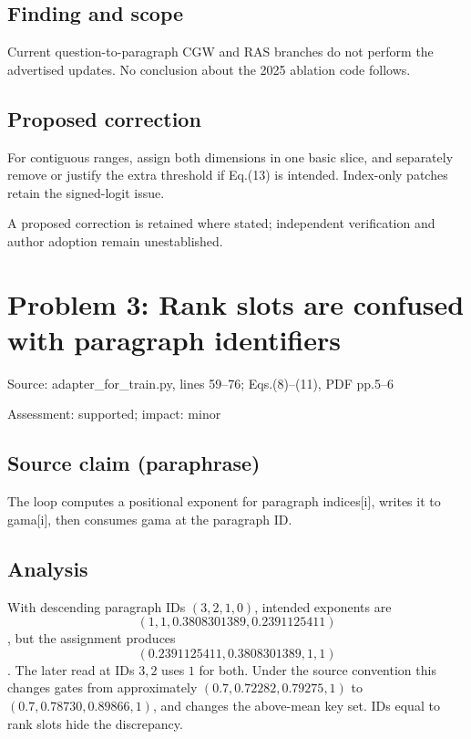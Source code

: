 \documentclass[11pt]{article}
\begin{document}
\subsection*{Finding and scope}

Current question-to-paragraph CGW and RAS branches do not perform the advertised updates. No conclusion about the 2025 ablation code follows.

\subsection*{Proposed correction}

For contiguous ranges, assign both dimensions in one basic slice, and separately remove or justify the extra threshold if Eq.(13) is intended. Index-only patches retain the signed-logit issue.

A proposed correction is retained where stated; independent verification and author adoption remain unestablished.

\section*{Problem 3: Rank slots are confused with paragraph identifiers}

Source: adapter\_for\_train.py, lines 59–76; Eqs.(8)–(11), PDF pp.5–6

Assessment: supported; impact: minor

\subsection*{Source claim (paraphrase)}

The loop computes a positional exponent for paragraph indices[i], writes it to gama[i], then consumes gama at the paragraph ID.

\subsection*{Analysis}

With descending paragraph IDs \((3,2,1,0)\), intended exponents are \[(1,1,0.3808301389,0.2391125411)\], but the assignment produces \[(0.2391125411,0.3808301389,1,1)\]. The later read at IDs \(3,2\) uses \(1\) for both. Under the source convention this changes gates from approximately \((0.7,0.72282,0.79275,1)\) to \((0.7,0.78730,0.89866,1)\), and changes the above-mean key set. IDs equal to rank slots hide the discrepancy.
\end{document}
